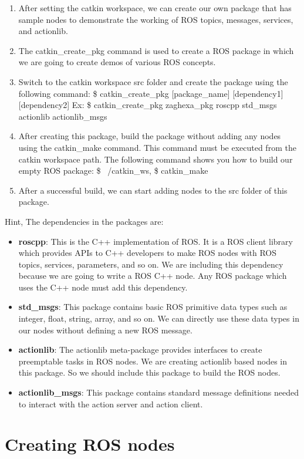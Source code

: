  \begin{enumerate}
 	\item After setting the catkin workspace, we can create our own package that has sample nodes to demonstrate the working of ROS topics, messages, services, and actionlib.
 	\item The catkin\_create\_pkg command is used to create a ROS package in which we are going to create demos of various ROS concepts.
 	\item Switch to the catkin workspace src folder and create the package using the following command: \$ catkin\_create\_pkg [package\_name] [dependency1] [dependency2]
 	Ex: \$ catkin\_create\_pkg zaghexa\_pkg roscpp std\_msgs actionlib actionlib\_msgs
 	\item After creating this package, build the package without adding any nodes using the catkin\_make command. This command must be executed from the catkin workspace path. The following command shows you how to build our empty ROS package: \$ ~/catkin_ws, \$ catkin_make
 	\item After a successful build, we can start adding nodes to the src folder of this package.
 \end{enumerate}
 Hint, The dependencies in the packages are:
 \begin{itemize}
 	\item \textbf{roscpp}: This is the C++ implementation of ROS. It is a ROS client library which provides APIs to C++ developers to make ROS nodes with ROS topics, services, parameters, and so on. We are including this dependency because we are going to write a ROS C++ node. Any ROS package which uses the C++ node must add this dependency.
 	\item \textbf{std\_msgs}: This package contains basic ROS primitive data types such as integer, float, string, array, and so on. We can directly use these data types in our nodes without defining a new ROS message.
 	\item \textbf{actionlib}: The actionlib meta-package provides interfaces to create preemptable tasks in ROS nodes. We are creating actionlib based nodes in this package. So we should include this package to build the ROS nodes.
 	\item \textbf{actionlib\_msgs}: This package contains standard message definitions needed to interact with the action server and action client.	
 \end{itemize}

\section{Creating ROS nodes}

